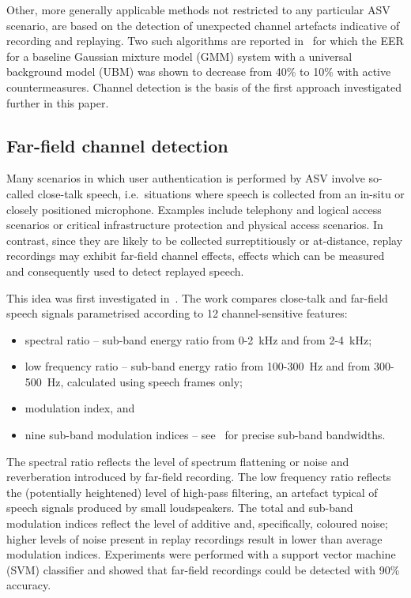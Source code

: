 Other, more generally applicable methods not restricted to any particular ASV scenario, are based on the detection of unexpected channel artefacts indicative of recording and replaying.
Two such algorithms are reported in~\cite{Wang2011} for which the EER for a baseline Gaussian mixture model (GMM) system with a universal background model (UBM) was shown to decrease from 40\% to 10\% with active countermeasures.  Channel detection is the basis of the first approach investigated further in this paper.



\subsection{Far-field channel detection}
\label{subsec:ffd}

Many scenarios in which user authentication is performed by ASV involve so-called close-talk speech, i.e.\ situations where speech is collected from an in-situ or closely positioned microphone.  Examples include telephony and logical access scenarios or critical infrastructure protection and physical access scenarios.  In contrast, since they are likely to be collected surreptitiously or at-distance, replay recordings may exhibit far-field channel effects, effects which can be measured and consequently used to detect replayed speech.  

This idea was first investigated in~\cite{Villalba2011}.  The work compares close-talk and far-field speech signals parametrised according to 12 channel-sensitive features:


\begin{itemize}
\item spectral ratio -- sub-band energy ratio from 0-2~kHz and from 2-4~kHz; 
\item low frequency ratio -- sub-band energy ratio from 100-300~Hz and from 300-500~Hz, calculated using speech frames only;
\item modulation index, and
\item nine sub-band modulation indices -- see~\cite{Villalba2011} for precise sub-band bandwidths.
\end{itemize}


The spectral ratio reflects the level of spectrum flattening or noise and reverberation introduced by far-field recording.  The low frequency ratio reflects the (potentially heightened) level of high-pass filtering, an artefact typical of speech signals produced by small loudspeakers.  The total and sub-band modulation indices reflect the level of additive and, specifically, coloured noise; higher levels of noise present in replay recordings result in lower than average modulation indices.  Experiments were performed with a support vector machine (SVM) classifier and showed that far-field recordings could be detected with 90\% accuracy.  %



